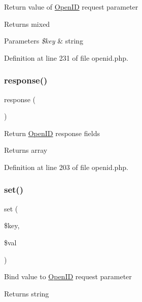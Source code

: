 Return value of \hyperlink{class_web_1_1_open_i_d}{Open\+ID} request parameter \begin{DoxyReturn}{Returns}
mixed 
\end{DoxyReturn}

\begin{DoxyParams}{Parameters}
{\em \$key} & string \\
\hline
\end{DoxyParams}


Definition at line 231 of file openid.\+php.

\hypertarget{class_web_1_1_open_i_d_a1e3f1bea94184e9ba901797124266e96}{}\label{class_web_1_1_open_i_d_a1e3f1bea94184e9ba901797124266e96} 
\subsubsection{\texorpdfstring{response()}{response()}}
{\footnotesize\ttfamily response (\begin{DoxyParamCaption}{ }\end{DoxyParamCaption})}

Return \hyperlink{class_web_1_1_open_i_d}{Open\+ID} response fields \begin{DoxyReturn}{Returns}
array 
\end{DoxyReturn}


Definition at line 203 of file openid.\+php.

\hypertarget{class_web_1_1_open_i_d_ac8d8012023e560c81f55a629022cb65a}{}\label{class_web_1_1_open_i_d_ac8d8012023e560c81f55a629022cb65a} 
\subsubsection{\texorpdfstring{set()}{set()}}
{\footnotesize\ttfamily set (\begin{DoxyParamCaption}\item[{}]{\$key,  }\item[{}]{\$val }\end{DoxyParamCaption})}

Bind value to \hyperlink{class_web_1_1_open_i_d}{Open\+ID} request parameter \begin{DoxyReturn}{Returns}
string 
\end{DoxyReturn}

